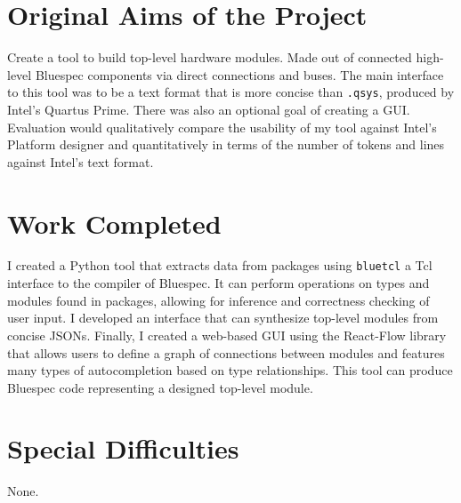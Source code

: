 \documentclass[12pt]{report}
\begin{document}
\section*{Original Aims of the Project}

Create a tool to build top-level hardware modules. Made out of connected high-level Bluespec components via direct connections and buses. The main interface to this tool was to be a text format that is more concise than \verb!.qsys!, produced by Intel's Quartus Prime. There was also an optional goal of creating a GUI. Evaluation would qualitatively compare the usability of my tool against Intel's Platform designer and quantitatively in terms of the number of tokens and lines against Intel's text format.

\section*{Work Completed}

I created a Python tool that extracts data from packages using \verb!bluetcl! a Tcl interface to the compiler of Bluespec. It can perform operations on types and modules found in packages, allowing for inference and correctness checking of user input. I developed an interface that can synthesize top-level modules from concise JSONs. Finally, I created a web-based GUI using the React-Flow library that allows users to define a graph of connections between modules and features many types of autocompletion based on type relationships. This tool can produce Bluespec code representing a designed top-level module.

\section*{Special Difficulties}

None.




\tableofcontents
\end{document}
